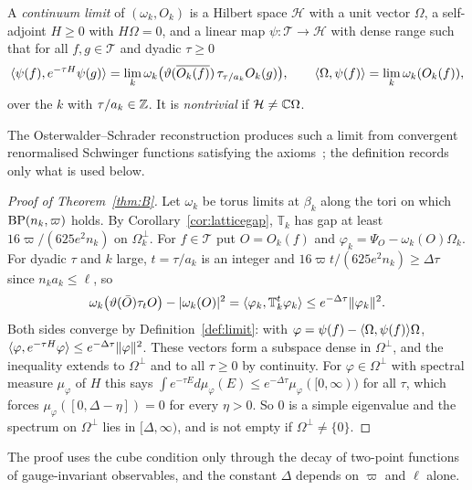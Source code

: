 \begin{definition}\label{def:limit}
A \emph{continuum limit} of $(\omega_k,O_k)$ is a Hilbert space $\mathcal H$ with
a unit vector $\Omega$, a self-adjoint $H\ge0$ with $H\Omega=0$, and a linear
map $\psi:\mathcal T\to\mathcal H$ with dense range such that for all
$f,g\in\mathcal T$ and dyadic $\tau\ge0$
\[
\langle \psi(f),e^{-\tau H}\psi(g)\rangle=\lim_k\omega_k\bigl(\vartheta(\overline{O_k(f)})
\,\tau_{\tau/a_k}O_k(g)\bigr),\qquad
\langle \Omega,\psi(f)\rangle=\lim_k\omega_k(O_k(f)),
\]
over the $k$ with $\tau/a_k\in\mathbb{Z}$. It is \emph{nontrivial} if $\mathcal H\ne\mathbb{C}
\Omega$.
\end{definition}

The Osterwalder--Schrader reconstruction produces such a limit from
convergent renormalised Schwinger functions satisfying the
axioms~\cite{OS73,OS75}; the definition records only what is used below.

\begin{proof}[Proof of Theorem~\ref{thm:B}]
Let $\omega_k$ be torus limits at $\beta_k$ along the tori on which
$\mathrm{BP}(n_k,\varpi)$ holds. By Corollary~\ref{cor:latticegap}, $\mathbb T_k$ has gap
at least $16\varpi/(625e^2n_k)$ on $\Omega_k^\perp$. For $f\in\mathcal T$ put
$O=O_k(f)$ and $\varphi_k=\Psi_O-\omega_k(O)\Omega_k$. For dyadic $\tau$ and $k$
large, $t=\tau/a_k$ is an integer and $16\varpi t/(625e^2n_k)\ge\Delta\tau$ since
$n_ka_k\le\ell$, so
\[
\omega_k\bigl(\vartheta(\bar O)\tau_tO\bigr)-|\omega_k(O)|^2=\langle \varphi_k,\mathbb T_k^t
\varphi_k\rangle\le e^{-\Delta\tau}\|\varphi_k\|^2 .
\]
Both sides converge by Definition~\ref{def:limit}: with $\varphi=\psi(f)-\langle \Omega,\psi(f)\rangle\Omega$, $\langle \varphi,e^{-\tau H}\varphi\rangle\le e^{-\Delta\tau}\|\varphi\|^2$. These
vectors form a subspace dense in $\Omega^\perp$, and the inequality extends to
$\Omega^\perp$ and to all $\tau\ge0$ by continuity. For $\varphi\in\Omega^\perp$ with
spectral measure $\mu_\varphi$ of $H$ this says $\int e^{-\tau E}d\mu_\varphi(E)\le e^{-\Delta
\tau}\mu_\varphi([0,\infty))$ for all $\tau$, which forces $\mu_\varphi([0,\Delta-\eta])=0$
for every $\eta>0$. So $0$ is a simple eigenvalue and the spectrum on
$\Omega^\perp$ lies in $[\Delta,\infty)$, and is not empty if $\Omega^\perp\ne\{0\}$.
\end{proof}

The proof uses the cube condition only through the decay of two-point
functions of gauge-invariant observables, and the constant $\Delta$ depends on
$\varpi$ and $\ell$ alone.
